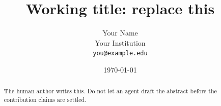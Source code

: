 \documentclass[11pt]{article}
\title{Working title: replace this}
\author{Your Name\\ Your Institution\\ \texttt{you@example.edu}}
\date{\today}
\begin{document}
\maketitle

\begin{abstract}
The human author writes this.
Do not let an agent draft the abstract before the contribution claims are settled.
\end{abstract}











\appendix

\end{document}
